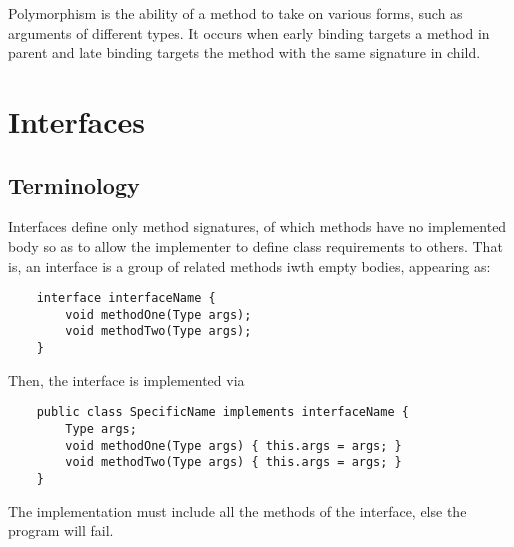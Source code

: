 \documentclass[letterpaper, openany, justified]{tufte-book}
\begin{document}
\begin{fullwidth}
\bigskip
Polymorphism is the ability of a method to take on various forms, such as arguments of different types. It occurs when early binding targets a method in parent and late binding targets the method with the same signature in child.

\chapter{Interfaces}
\section{Terminology}
Interfaces define only method signatures, of which methods have no implemented body so as to allow the implementer to define class requirements to others. That is, an interface is a group of related methods iwth empty bodies, appearing as:
\begin{lstlisting}
    interface interfaceName {
        void methodOne(Type args);
        void methodTwo(Type args);
    }
\end{lstlisting}
Then, the interface is implemented via
\begin{lstlisting}
    public class SpecificName implements interfaceName {
        Type args;
        void methodOne(Type args) { this.args = args; }
        void methodTwo(Type args) { this.args = args; }
    }
\end{lstlisting}
The implementation must include all the methods of the interface, else the program will fail.


\end{fullwidth}
\end{document}
